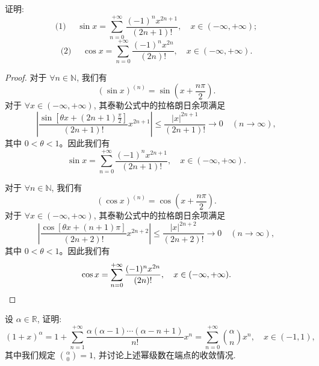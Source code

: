 \begin{example}\label{example:ma-11-3-3}
证明:
\[
  \text{(1) }\quad
  \sin x=\sum_{n=0}^{+\infty}\frac{(-1)^nx^{2n+1}}{(2n+1)!},
  \quad x\in(-\infty,+\infty);
\]
\[
  \text{(2) }\quad
  \cos x=\sum_{n=0}^{+\infty}\frac{(-1)^nx^{2n}}{(2n)!},
  \quad x\in(-\infty,+\infty).
\]
\end{example}


\begin{proof}
对于 $\forall n\in\mathbb N$, 我们有
\[
  (\sin x)^{(n)}=\sin\left(x+\frac{n\pi}{2}\right).
\]
对于 $\forall x\in(-\infty,+\infty)$, 其泰勒公式中的拉格朗日余项满足
\[
  \left|
    \frac{\sin\left[\theta x+(2n+1)\frac{\pi}{2}\right]}{(2n+1)!}
    x^{2n+1}
  \right|
  \leqslant
  \frac{|x|^{2n+1}}{(2n+1)!}
  \to0\quad(n\to\infty),
\]
其中 $0<\theta<1$。因此我们有
\[
  \sin x=\sum_{n=0}^{+\infty}\frac{(-1)^nx^{2n+1}}{(2n+1)!},
  \quad x\in(-\infty,+\infty).
\]

对于 $\forall n\in\mathbb N$, 我们有
\[
  (\cos x)^{(n)}=\cos\left(x+\frac{n\pi}{2}\right).
\]
对于 $\forall x\in(-\infty,+\infty)$, 其泰勒公式中的拉格朗日余项满足
\[
  \left|
    \frac{\cos[\theta x+(n+1)\pi]}{(2n+2)!}
    x^{2n+2}
  \right|
  \leqslant
  \frac{|x|^{2n+2}}{(2n+2)!}
  \to0\quad(n\to\infty),
\]
其中 $0<\theta<1$。因此我们有
\[
  \cos x=\sum_{n=0}^{+\infty}\frac{(-1)^nx^{2n}}{(2n)!},
  \quad x\in(-\infty,+\infty).
\qedhere
\]
\end{proof}


\begin{example}\label{example:ma-11-3-4}
设 $\alpha\in\mathbb R$, 证明:
\begin{equation}
  (1+x)^\alpha
  =
  1+\sum_{n=1}^{+\infty}
  \frac{\alpha(\alpha-1)\cdots(\alpha-n+1)}{n!}x^n
  =
  \sum_{n=0}^{+\infty}\binom{\alpha}{n}x^n,
  \quad x\in(-1,1),
  \label{eq:ma-11-3-2}
\end{equation}
其中我们规定 $\binom{\alpha}{0}=1$, 并讨论上述幂级数在端点的收敛情况.
\end{example}


